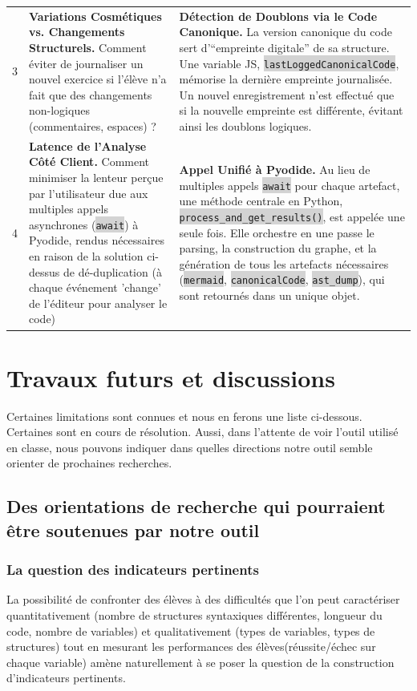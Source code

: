 \documentclass[11pt,a4paper]{article}
\newcommand{\code}[1]{\colorbox{lightgray}{\texttt{\small #1}}}
\begin{document}
\begin{table}[htbp]
\begin{tabularx}{\textwidth}{@{} l X X @{}}
        3 & \textbf{Variations Cosmétiques vs. Changements Structurels.}
            Comment éviter de journaliser un nouvel exercice si l'élève n'a fait que des changements non-logiques (commentaires, espaces) ?
            & \textbf{Détection de Doublons via le Code Canonique.}
            La version canonique du code sert d'``empreinte digitale'' de sa structure. Une variable JS, \code{lastLoggedCanonicalCode}, mémorise la dernière empreinte journalisée. Un nouvel enregistrement n'est effectué que si la nouvelle empreinte est différente, évitant ainsi les doublons logiques. \\
        \addlinespace

        4 & \textbf{Latence de l'Analyse Côté Client.}
            Comment minimiser la lenteur perçue par l'utilisateur due aux multiples appels asynchrones (\code{await}) à Pyodide, rendus nécessaires en raison de la solution ci-dessus de dé-duplication (à chaque événement 'change' de l'éditeur pour analyser le code) 
            & \textbf{Appel Unifié à Pyodide.}
            Au lieu de multiples appels \code{await} pour chaque artefact, une méthode centrale en Python, \code{process\_and\_get\_results()}, est appelée une seule fois. Elle orchestre en une passe le parsing, la construction du graphe, et la génération de tous les artefacts nécessaires (\code{mermaid}, \code{canonicalCode}, \code{ast\_dump}), qui sont retournés dans un unique objet. \\
        
        \bottomrule
    \end{tabularx}
\end{table}


\clearpage
\section{Travaux futurs et discussions}
 Certaines limitations sont connues et nous en ferons une liste ci-dessous. Certaines sont en cours de résolution. Aussi, dans l'attente de voir l'outil utilisé en classe, nous pouvons indiquer dans quelles directions notre outil semble orienter de prochaines recherches.

\subsection{Des orientations de recherche qui pourraient être soutenues par notre outil}
\subsubsection{La question des indicateurs pertinents}
La possibilité de confronter des élèves à des difficultés que l'on peut caractériser quantitativement (nombre de structures syntaxiques différentes, longueur du code, nombre de variables) et qualitativement (types de variables, types de structures) tout en mesurant les performances des élèves(réussite/échec sur chaque variable) amène naturellement à se poser la question de la construction d'indicateurs pertinents.
\end{document}
